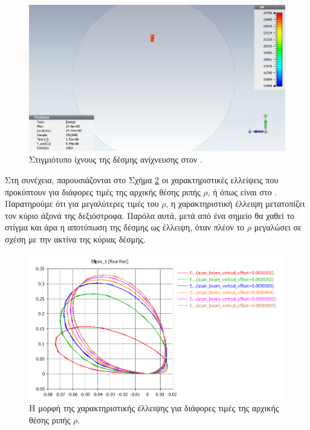 \begin{figure}[tbh]
	\includegraphics[width=\textwidth]{figures/CST-EBS-implementation/CST-EBS-2D-monitor-snapshot}
	\centering
	\caption{Στιγμιότυπο ίχνους της δέσμης ανίχνευσης στον .}
	\label{fig:CST-EBS-2D-monitor-snapshot}
\end{figure}

Στη συνέχεια, παρουσιάζονται στο Σχήμα \ref{fig:CST-EBS-ellipses} οι χαρακτηριστικές ελλείψεις που προκύπτουν για διάφορες τιμές της αρχικής θέσης ριπής $\rho$, ή  όπως είναι στο .
Παρατηρούμε ότι για μεγαλύτερες τιμές του $\rho$, η χαρακτηριστική έλλειψη μετατοπίζει τον κύριο άξονά της δεξιόστροφα. 
Παρόλα αυτά, μετά από ένα σημείο θα χαθεί το στίγμα και άρα η αποτύπωση της δέσμης ως έλλειψη, όταν πλέον το $\rho$ μεγαλώσει σε σχέση με την ακτίνα της κύριας δέσμης.

\begin{figure}[tbh]
	\includegraphics[width=\textwidth]{figures/CST-EBS-implementation/CST-EBS-ellipses}
	\centering
	\caption{Η μορφή της χαρακτηριστικής έλλειψης για διάφορες τιμές της αρχικής θέσης ριπής $\rho$.}
	\label{fig:CST-EBS-ellipses}
\end{figure}

